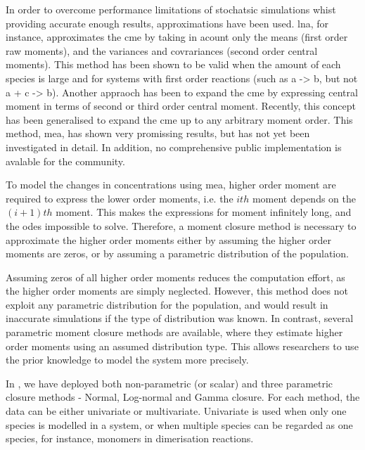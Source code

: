 In order to overcome performance limitations of stochatsic simulations whist providing accurate enough results, approximations have been used.
\Gls{lna}, for instance, approximates the 
\gls{cme}
by taking in acount only the means (first order raw moments), and the variances and covrariances (second order central moments).
This method has been shown to be valid when the amount of each species is large and for systems with first order reactions (such as  a -> b, but not a + c  -> b).
Another appraoch has been to expand the \gls{cme} by expressing central moment in terms of second or third order central moment.
Recently, this concept has been generalised to expand the \gls{cme} up to any arbitrary moment order.
\cite{ale_general_2013}
This method, \gls{mea}, has shown very promissing results, but has not yet been investigated in detail. 
In addition, no comprehensive public implementation is avalable for the community. 




To model the changes in concentrations using \gls{mea}, higher order moment are required to express the lower order moments, i.e. the $ith$ moment depends on the $(i+1)th$ moment. 
This makes the expressions for moment infinitely long, and the \glspl{ode} impossible to solve. 
Therefore, a moment closure method is necessary to approximate the higher order moments either by assuming the higher order moments are zeros, or by assuming a parametric distribution of the population. 

Assuming zeros of all higher order moments reduces the computation effort, as the higher order moments are simply neglected.
However, this method does not exploit any parametric distribution for the population, and would result in inaccurate simulations if the type of distribution was known. 
In contrast, several parametric moment closure methods are available, where they estimate higher order moments using an assumed distribution type.
This allows researchers to use the prior knowledge to model the system more precisely. 

In \means, we have deployed both non-parametric (or scalar) and three parametric closure methods - Normal, Log-normal and Gamma closure.
For each method, the data can be either univariate or multivariate. 
Univariate is used when only one species is modelled in a system, or when multiple species can be regarded as one species, for instance, monomers in dimerisation reactions. 

